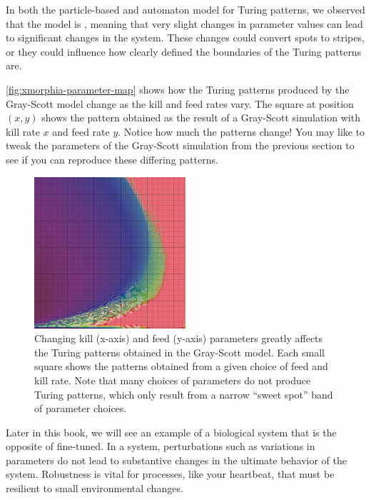 In both the particle-based and automaton model for Turing patterns, we observed that the model is , meaning that very slight changes in parameter values can lead to significant changes in the system. These changes could convert spots to stripes, or they could influence how clearly defined the boundaries of the Turing patterns are.

\autoref{fig:xmorphia-parameter-map} shows how the Turing patterns produced by the Gray-Scott model change as the kill and feed rates vary. The square at position $(x, y)$ shows the pattern obtained as the result of a Gray-Scott simulation with kill rate $x$ and feed rate $y$. Notice how much the patterns change! You may like to tweak the parameters of the Gray-Scott simulation from the previous section to see if you can reproduce these differing patterns.\\

\begin{figure}[h]
\centering
\mySfFamily
\includegraphics[width = 0.5\textwidth]{../images/xmorphia-parameter-map.jpg}
\caption{Changing kill (x-axis) and feed (y-axis) parameters greatly affects the Turing patterns obtained in the Gray-Scott model. Each small square shows the patterns obtained from a given choice of feed and kill rate.  Note that many choices of parameters do not produce Turing patterns, which only result from a narrow ``sweet spot'' band of parameter choices.}
\label{fig:xmorphia-parameter-map}
\end{figure}

Later in this book, we will see an example of a biological system that is the opposite of fine-tuned. In a  system, perturbations such as variations in parameters do not lead to substantive changes in the ultimate behavior of the system. Robustness is vital for processes, like your heartbeat, that must be resilient to small environmental changes.

